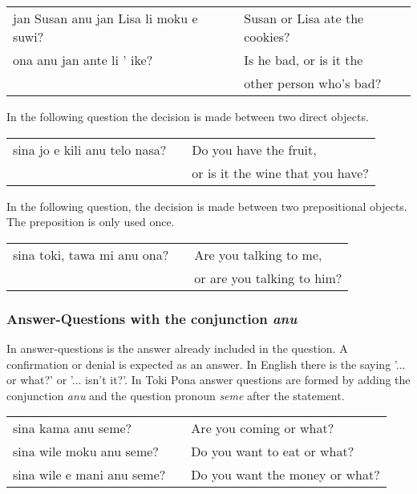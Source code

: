 \begin{supertabular}{p{5,5cm}|ll}
    jan Susan anu jan Lisa li moku e suwi? &  & Susan or Lisa ate the cookies? \\
    ona anu jan ante li ' ike?             &  & Is he bad, or is it the        \\ && other person who's bad? \\
\end{supertabular}

In the following question the decision is made between two direct objects.

\begin{supertabular}{p{5,5cm}|ll}
    sina jo e kili anu telo nasa? &  & Do you have the fruit, \\ && or is it the wine that you have? \\
\end{supertabular}

In the following question, the decision is made between two prepositional objects.
The preposition is only used once.

\begin{supertabular}{p{5,5cm}|ll}
    sina toki, tawa mi anu ona? &  & Are you talking to me, \\ && or are you talking to him? \\
\end{supertabular}

\subsubsection*{Answer-Questions with the conjunction \textit{anu}}
In answer-questions is the answer already included in the question.
A confirmation or denial is expected as an answer.
In English there is the saying '... or what?' or '... isn't it?'.
In Toki Pona answer questions are formed by adding the conjunction \textit{anu} and the question pronoun \textit{seme} after the statement.

\begin{supertabular}{p{5,5cm}|ll}
    sina kama anu seme?        &  & Are you coming or what?        \\
    sina wile moku anu seme?   &  & Do you want to eat or what?    \\
    sina wile e mani anu seme? &  & Do you want the money or what? \\
\end{supertabular}

